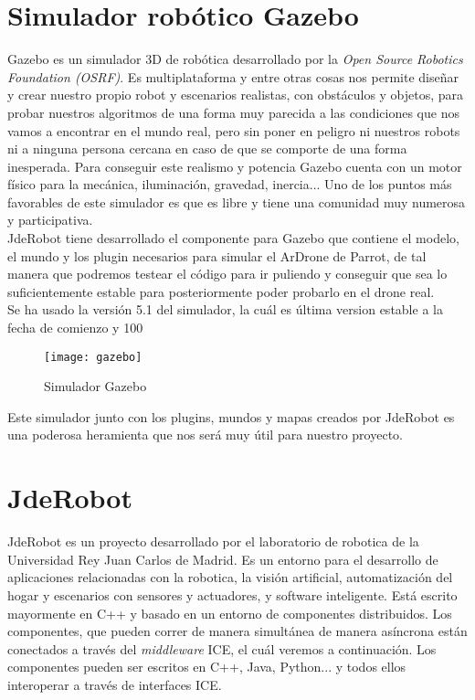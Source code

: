 \section{Simulador robótico Gazebo}

Gazebo es un simulador 3D de robótica desarrollado por la \textit{Open Source Robotics Foundation (OSRF)}. Es multiplataforma y entre otras cosas nos permite diseñar y crear nuestro propio robot y escenarios realistas, con obstáculos y objetos, para probar nuestros algoritmos de una forma muy parecida a las condiciones que nos vamos a encontrar en el mundo real, pero sin poner en peligro ni nuestros robots ni a ninguna persona cercana en caso de que se comporte de una forma inesperada. Para conseguir este realismo y potencia Gazebo cuenta con un motor físico para la mecánica, iluminación, gravedad, inercia... Uno de los puntos más favorables de este simulador es que es libre y tiene una comunidad muy numerosa y participativa.\\

JdeRobot tiene desarrollado el componente para Gazebo que contiene el modelo, el mundo y los plugin necesarios para simular el ArDrone de Parrot, de tal manera que podremos testear el código para ir puliendo y conseguir que sea lo suficientemente estable para posteriormente poder probarlo en el drone real.\\

Se ha usado la versión 5.1 del simulador, la cuál es última version estable a la fecha de comienzo y 100%

\begin{figure}[htb]
\centering
\texttt{[image: gazebo]}
\caption{Simulador Gazebo}
\label{fig:gazebo}
\end{figure}

Este simulador junto con los plugins, mundos y mapas creados por JdeRobot es una poderosa heramienta que nos será muy útil para nuestro proyecto.

\section{JdeRobot}

JdeRobot es un proyecto desarrollado por el laboratorio de robotica de la Universidad Rey Juan Carlos de Madrid. Es un entorno para el desarrollo de aplicaciones relacionadas con la robotica, la visión artificial, automatización del hogar y escenarios con sensores y actuadores, y software inteligente. Está escrito mayormente en C++ y basado en un entorno de componentes distribuidos. Los componentes, que pueden correr de manera simultánea de manera asíncrona están conectados a través del \emph{middleware} ICE, el cuál veremos a continuación. Los componentes pueden ser escritos en C++, Java, Python... y todos ellos interoperar a través de interfaces ICE.\\

